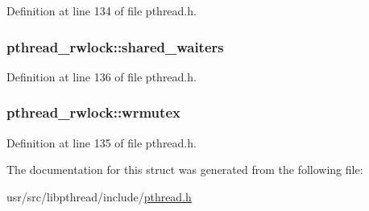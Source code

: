 Definition at line 134 of file pthread.\+h.

\hypertarget{structpthread__rwlock_a513e968cb2dea01c044a3304c26b1d07}{
\subsubsection[{shared\+\_\+waiters}]{ pthread\+\_\+rwlock\+::shared\+\_\+waiters}}\label{structpthread__rwlock_a513e968cb2dea01c044a3304c26b1d07}


Definition at line 136 of file pthread.\+h.

\hypertarget{structpthread__rwlock_acebaf123f0d451e8aa6e7734c6bcca5b}{
\subsubsection[{wrmutex}]{ pthread\+\_\+rwlock\+::wrmutex}}\label{structpthread__rwlock_acebaf123f0d451e8aa6e7734c6bcca5b}


Definition at line 135 of file pthread.\+h.



The documentation for this struct was generated from the following file\+:\begin{DoxyCompactItemize}
\item 
usr/src/libpthread/include/\hyperlink{pthread_8h}{pthread.\+h}\end{DoxyCompactItemize}
